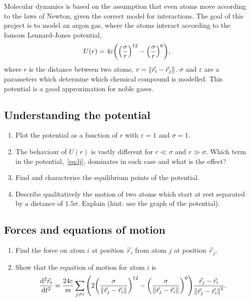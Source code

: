 \documentclass[11pt,british,a4paper]{report}
\begin{document}
Molecular dynamics is based on the assumption that even atoms move according to the laws of Newton, given the correct model for interactions. The goal of this project is to model an argon gas, where the atoms interact according to the famous Lennard-Jones potential,
\begin{equation}
    U(r) = 4\varepsilon\qty(\qty(\frac{\sigma}{r})^{12} - \qty(\frac{\sigma}{r})^6), \label{eq:lj}
\end{equation}
where \(r\) is the distance between two atoms, \(r=\norm{\vec{r}_i-\vec{r}_j}\). \(\sigma\) and \(\varepsilon\) are a parameters which determine which chemical compound is modelled. This potential is a good approximation for noble gases.

\subsection{Understanding the potential}\label{subsec:understanding}
\begin{enumerate}[label=\roman*.]
    \item Plot the potential as a function of \(r\) with \(\varepsilon=1\) and \(\sigma=1\).
    \item The behaviour of \(U(r)\) is vastly different for \(r \ll \sigma\) and \(r \gg \sigma\). Which term in the potential,~\vref{eq:lj}, dominates in each case and what is the effect?
    \item Find and characterise the equilibrium points of the potential.
    \item Describe qualitatively the motion of two atoms which start at rest separated by a distance of \(\num{1.5}\sigma\). Explain (hint: use the graph of the potential).
\end{enumerate}

\subsection{Forces and equations of motion}
\begin{enumerate}[label=\roman*.]
    \item Find the force on atom \(i\) at position \(\vec{r}_i\) from atom \(j\) at position \(\vec{r}_j\).
    \item Show that the equation of motion for atom \(i\) is
    \begin{equation}
        \dv[2]{\vec{r}_i}{t} = \frac{24\varepsilon}{m} \sum_{j \neq i} \qty(2\qty(\frac{\sigma}{\norm{\vec{r}_j-\vec{r}_i}})^{12}-\qty(\frac{\sigma}{\norm{\vec{r}_j-\vec{r}_i}})^6)\frac{\vec{r}_j-\vec{r}_i}{\norm{\vec{r}_j-\vec{r}_i}^2}.
    \end{equation}
\end{enumerate}
\end{document}
